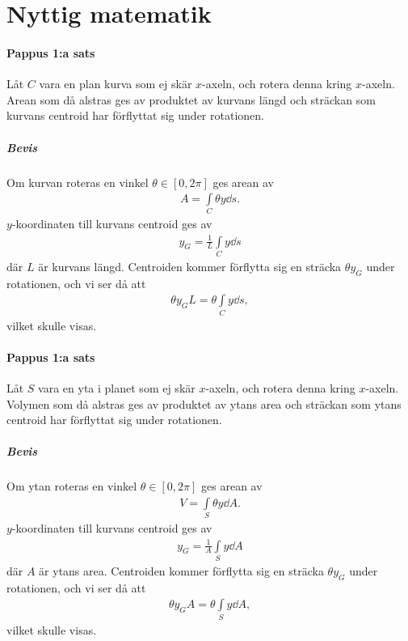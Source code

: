 \section{Nyttig matematik}

\paragraph{Pappus 1:a sats}
Låt $C$ vara en plan kurva som ej skär $x$-axeln, och rotera denna kring $x$-axeln. Arean som då alstras ges av produktet av kurvans längd och sträckan som kurvans centroid har förflyttat sig under rotationen.

\subparagraph{Bevis}
Om kurvan roteras en vinkel $\theta\in [0, 2\pi]$ ges arean av
\begin{align*}
	A = \int\limits_{C}\theta y\dd{s}.
\end{align*}
$y$-koordinaten till kurvans centroid ges av
\begin{align*}
	y_{G} = \frac{1}{L}\int\limits_{C}y\dd{s}
\end{align*}
där $L$ är kurvans längd. Centroiden kommer förflytta sig en sträcka $\theta y_{G}$ under rotationen, och vi ser då att
\begin{align*}
	\theta y_{G}L = \theta\int\limits_{C}y\dd{s},
\end{align*}
vilket skulle visas.

\paragraph{Pappus 1:a sats}
Låt $S$ vara en yta i planet som ej skär $x$-axeln, och rotera denna kring $x$-axeln. Volymen som då alstras ges av produktet av ytans area och sträckan som ytans centroid har förflyttat sig under rotationen.

\subparagraph{Bevis}
Om ytan roteras en vinkel $\theta\in [0, 2\pi]$ ges arean av
\begin{align*}
	V = \int\limits_{S}\theta y\dd{A}.
\end{align*}
$y$-koordinaten till kurvans centroid ges av
\begin{align*}
	y_{G} = \frac{1}{A}\int\limits_{S}y\dd{A}
\end{align*}
där $A$ är ytans area. Centroiden kommer förflytta sig en sträcka $\theta y_{G}$ under rotationen, och vi ser då att
\begin{align*}
	\theta y_{G}A = \theta\int\limits_{S}y\dd{A},
\end{align*}
vilket skulle visas.